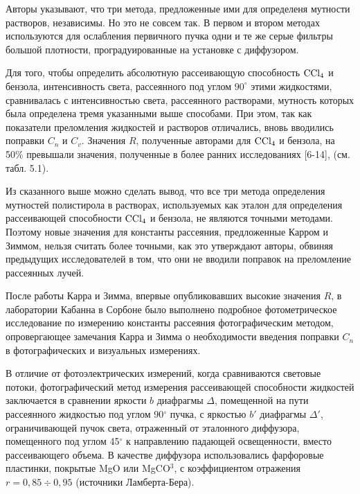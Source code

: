 Авторы указывают, что три метода, предложенные ими для определеня
мутности растворов, независимы. Но это не совсем так. В первом
и втором методах используются для ослабления первичного пучка
одни и те же серые фильтры большой плотности, проградуированные
на установке с диффузором.

Для того, чтобы определить абсолютную рассеивающую способность
$\rm CCl_4$ и бензола, интенсивность света, рассеянного под углом
$90^{\circ}$ этими жидкостями, сравнивалась с интенсивностью
света, рассеянного растворами, мутность которых была определена
тремя указанными  выше способами. При этом, так как показатели
преломления жидкостей и растворов отличались, вновь вводились
поправки $C_n$ и $C_v$. Значения $R$, полученные авторами для
$\rm CCl_4$ и бензола, на 50\% превышали значения, полученные в
более ранних исследованиях [6-14], (см. табл. 5.1).

Из сказанного выше можно сделать вывод, что все три метода
определения мутностей полистирола в растворах, используемых как
эталон для определения рассеивающей способности $\rm CCl_4$ и
бензола, не являются точными методами. Поэтому новые значения для
константы рассеяния, предложенные Карром и Зиммом, нельзя считать
более точными, как это утверждают авторы, обвиняя предыдущих
исследователей в том, что они не вводили поправок на преломление
рассеянных лучей.




После работы Карра и Зимма, впервые опубликовавших высокие значения $R$, 
в лаборатории Кабанна в Сорбоне было выполнено подробное фотометрическое
исследование по измерению константы рассеяния фотографическим методом, 
опровергающее замечания Карра и Зимма о необходимости 
введения поправки $C_n$ в фотографических и визуальных измерениях.

В отличие от фотоэлектрических измерений, 
когда сравниваются световые потоки, фотографический метод измерения рассеивающей способности жидкостей заключается в сравнении яркости $b$ диафрагмы $\Delta$,
помещенной на пути рассеянного жидкостью под углом 90$^\circ$ пучка, с яркостью $b'$ диафрагмы $\Delta '$, ограничивающей пучок света, отраженный от эталонного диффузора, помещенного под углом 45$^\circ$ к направлению падающей освещенности, вместо рассеивающего объема. В качестве диффузора использовались фарфоровые пластинки, покрытые MgO или MgCO$^3$, с коэффициентом отражения $r=0,85\div0,95$ (источники Ламберта-Бера).

